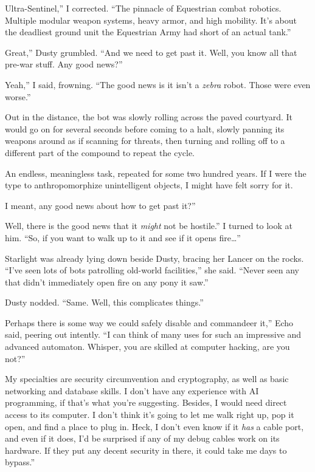 \leavevmode{}Ultra-Sentinel,” I corrected. “The pinnacle of Equestrian combat robotics. Multiple modular weapon systems, heavy armor, and high mobility. It’s about the deadliest ground unit the Equestrian Army had short of an actual tank.”

\leavevmode{}Great,” Dusty grumbled. “And we need to get past it. Well, you know all that pre-war stuff. Any good news?”

\leavevmode{}Yeah,” I said, frowning. “The good news is it isn’t a \textit{zebra} robot. Those were even worse.”

Out in the distance, the bot was slowly rolling across the paved courtyard. It would go on for several seconds before coming to a halt, slowly panning its weapons around as if scanning for threats, then turning and rolling off to a different part of the compound to repeat the cycle.

An endless, meaningless task, repeated for some two hundred years. If I were the type to anthropomorphize unintelligent objects, I might have felt sorry for it.

\leavevmode{}I meant, any good news about how to get past it?”

\leavevmode{}Well, there is the good news that it \textit{might} not be hostile.” I turned to look at him. “So, if you want to walk up to it and see if it opens fire…”

Starlight was already lying down beside Dusty, bracing her Lancer on the rocks. “I’ve seen lots of bots patrolling old-world facilities,” she said. “Never seen any that didn’t immediately open fire on any pony it saw.”

Dusty nodded. “Same. Well, this complicates things.”

\leavevmode{}Perhaps there is some way we could safely disable and commandeer it,” Echo said, peering out intently. “I can think of many uses for such an impressive and advanced automaton. Whisper, you are skilled at computer hacking, are you not?”

\leavevmode{}My specialties are security circumvention and cryptography, as well as basic networking and database skills. I don’t have any experience with AI programming, if that’s what you’re suggesting. Besides, I would need direct access to its computer. I don’t think it’s going to let me walk right up, pop it open, and find a place to plug in. Heck, I don’t even know if it \textit{has} a cable port, and even if it does, I’d be surprised if any of my debug cables work on its hardware. If they put any decent security in there, it could take me days to bypass.”

